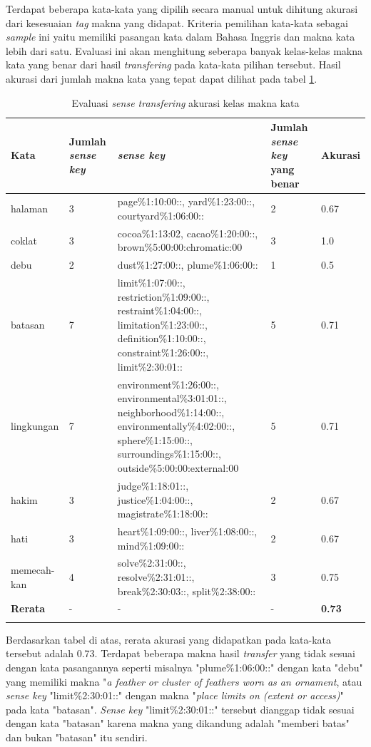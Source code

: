 Terdapat beberapa kata-kata yang dipilih secara manual untuk dihitung akurasi dari kesesuaian \textit{tag} makna yang didapat. Kriteria pemilihan kata-kata sebagai \textit{sample} ini yaitu memiliki pasangan kata  dalam Bahasa Inggris dan makna kata lebih dari satu. Evaluasi ini akan menghitung seberapa banyak kelas-kelas makna kata yang benar dari hasil \textit{transfering} pada kata-kata pilihan tersebut. Hasil akurasi dari jumlah makna kata yang tepat dapat dilihat pada tabel \ref{table:akuras-kelas-makna-kata}.

\begin{longtable}{|p{1.8cm}|p{1.2cm}|p{5cm}|p{1.2cm}|p{1.5cm}|} 
	\hline
	\textbf{Kata} & \textbf{Jumlah \textit{sense key}} & \textbf{\textit{sense key}}  & \textbf{Jumlah \textit{sense key} yang benar} & \textbf{Akurasi} \\ \hline
	halaman & 3 &  page\%1:10:00::, yard\%1:23:00::, courtyard\%1:06:00:: & 2 & 0.67 \\ \hline
	coklat & 3 & cocoa\%1:13:02, cacao\%1:20:00::, brown\%5:00:00:chromatic:00 & 3 & 1.0 \\ \hline
	debu & 2 & dust\%1:27:00::, plume\%1:06:00:: & 1 & 0.5 \\ \hline
	batasan & 7 & limit\%1:07:00::, restriction\%1:09:00::, restraint\%1:04:00::, limitation\%1:23:00::, definition\%1:10:00::, constraint\%1:26:00::, limit\%2:30:01:: & 5 & 0.71 \\ \hline
	lingkungan & 7 & environment\%1:26:00::, environmental\%3:01:01::, neighborhood\%1:14:00::, environmentally\%4:02:00::, sphere\%1:15:00::, surroundings\%1:15:00::, outside\%5:00:00:external:00 & 5 & 0.71 \\ \hline
	hakim & 3 & judge\%1:18:01::, justice\%1:04:00::, magistrate\%1:18:00:: & 2 & 0.67 \\ \hline
	hati & 3 & heart\%1:09:00::, liver\%1:08:00::, mind\%1:09:00:: & 2 & 0.67 \\ \hline
	memecah-kan & 4 & solve\%2:31:00::, resolve\%2:31:01::, break\%2:30:03::, split\%2:38:00:: & 3 & 0.75 \\ \hline
	\hline
	\textbf{Rerata} & - & - & - & \textbf{0.73} \\ \hline
	\caption{Evaluasi \textit{sense transfering} akurasi kelas makna kata}
	\label{table:akuras-kelas-makna-kata}
\end{longtable}
 
Berdasarkan tabel di atas, rerata akurasi yang didapatkan pada kata-kata tersebut adalah 0.73. Terdapat beberapa makna hasil \textit{transfer} yang tidak sesuai dengan kata pasangannya seperti misalnya "plume\%1:06:00::" dengan kata "debu" yang memiliki makna "\textit{a feather or cluster of feathers worn as an ornament}, atau \textit{sense key} "limit\%2:30:01::" dengan makna "\textit{place limits on (extent or access)}" pada kata "batasan". \textit{Sense key} "limit\%2:30:01::" tersebut dianggap tidak sesuai dengan kata "batasan" karena makna yang dikandung adalah "memberi batas" dan bukan "batasan" itu sendiri.

